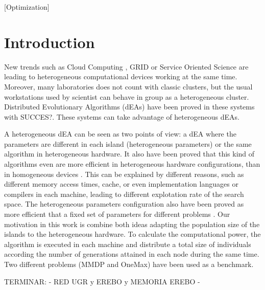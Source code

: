 \documentclass{sig-alternate}
\begin{document}
[Optimization]






%
%
\section{Introduction}
\label{sec:intro}
%
New trends such as Cloud Computing \cite{CLOUD}, GRID \cite{OPENSCIENCEGRID} or Service Oriented Science are leading to heterogeneous computational devices working at the same time.  Moreover, many laboratories does not count with classic clusters, but the usual workstations used by scientist can behave in group as a heterogeneous cluster. Distributed Evolutionary Algorithms (dEAs) have been proved in these systems with SUCCES?. These systems can take advantage of heterogeneous dEAs. 

A heterogeneous dEA can be seen as two points of view: a dEA where the parameters are different in each island (heterogeneous parameters) or the same algorithm in heterogeneous hardware. It also have been proved that this kind of algorithms even are more efficient in heterogeneous hardware configurations, than in homogeneous devices \cite{HETEROGENEOUSHARD}. This can be explained by different reasons, such as different memory access times, cache, or even implementation languages or compilers in each machine, leading to different explotation rate of the search space. The heterogeneous parameters configuration also have been proved as more efficient that a fixed set of parameters for different problems \cite{HETEROGENEOUSPARAMETERS}. Our motivation in this work is combine both ideas adapting the population size of the islands to the heterogeneous hardware. To calculate the computational power, the algorithm is executed in each machine and distribute a total size of individuals according the number of generations attained in each node during the same time. Two different problems (MMDP and OneMax) have been used as a benchmark.

TERMINAR:
- RED UGR y EREBO y MEMORIA EREBO
-
\end{document}
